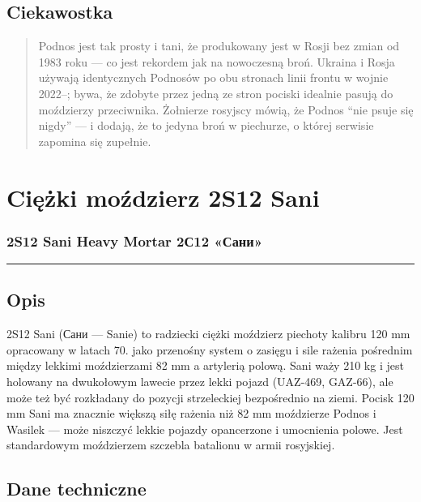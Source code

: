 \documentclass[12pt,openany,oneside]{book}
\begin{document}
\section{Ciekawostka}\label{ciekawostka-25}

\begin{quote}
Podnos jest tak prosty i tani, że produkowany jest w Rosji bez zmian od
1983 roku --- co jest rekordem jak na nowoczesną broń. Ukraina i Rosja
używają identycznych Podnosów po obu stronach linii frontu w wojnie
2022--; bywa, że zdobyte przez jedną ze stron pociski idealnie pasują do
moździerzy przeciwnika. Żołnierze rosyjscy mówią, że Podnos ``nie psuje
się nigdy'' --- i dodają, że to jedyna broń w piechurze, o której
serwisie zapomina się zupełnie.
\end{quote}

\chapter{Ciężki moździerz 2S12
Sani}\label{ciux119ux17cki-moux17adzierz-2s12-sani}

\subsection{2S12 Sani Heavy Mortar \textbar{} 2С12
«Сани»}\label{s12-sani-heavy-mortar-2ux44112-ux441ux430ux43dux438}

\begin{center}\rule{0.5\linewidth}{0.5pt}\end{center}

\section{Opis}\label{opis-26}

2S12 Sani (Сани --- Sanie) to radziecki ciężki moździerz piechoty
kalibru 120 mm opracowany w latach 70. jako przenośny system o zasięgu i
sile rażenia pośrednim między lekkimi moździerzami 82 mm a artylerią
polową. Sani waży 210 kg i jest holowany na dwukołowym lawecie przez
lekki pojazd (UAZ-469, GAZ-66), ale może też być rozkładany do pozycji
strzeleckiej bezpośrednio na ziemi. Pocisk 120 mm Sani ma znacznie
większą siłę rażenia niż 82 mm moździerze Podnos i Wasilek --- może
niszczyć lekkie pojazdy opancerzone i umocnienia polowe. Jest
standardowym moździerzem szczebla batalionu w armii rosyjskiej.

\section{Dane techniczne}\label{dane-techniczne-26}
\end{document}
